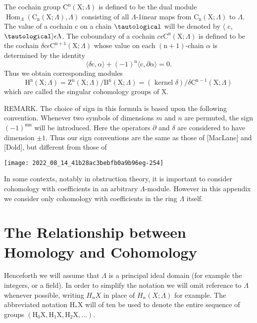 \documentclass[10pt]{article}
\begin{document}
The cochain group $\mathrm{C}^{\mathrm{n}}(\mathrm{X} ; \Lambda)$ is defined to be the dual module $\operatorname{Hom}_{\Lambda}\left(\mathrm{C}_{\mathrm{n}}(\mathrm{X} ; \Lambda), \Lambda\right)$ consisting of all $\Lambda$-1inear maps from $\mathrm{C}_{\mathrm{n}}(\mathrm{X} ; \Lambda)$ to $\Lambda$. The value of a cochain $\mathrm{c}$ on a chain $\tautological$ will be denoted by $\langle$ c, $\tautological\rangle \epsilon \Lambda$. The coboundary of a cochain $c \epsilon \mathrm{C}^{\mathrm{n}}(\mathrm{X} ; \Lambda)$ is defined to be the cochain $\delta \mathrm{c} \epsilon \mathrm{C}^{\mathrm{n}+1}(\mathrm{X} ; \Lambda)$ whose value on each $(\mathrm{n}+1)$-chain $\alpha$ is determined by the identity
$$
\langle\delta \mathrm{c}, \alpha\rangle+(-1)^{\mathrm{n}}\langle\mathrm{c}, \partial \alpha\rangle=0 .
$$
Thus we obtain corresponding modules
$$
\mathrm{H}^{\mathrm{n}}(\mathrm{X} ; \Lambda)=\mathrm{Z}^{\mathrm{n}}(\mathrm{X} ; \Lambda) / \mathrm{B}^{\mathrm{n}}(\mathrm{X} ; \Lambda)=(\text { kernel } \delta) / \delta \mathrm{C}^{\mathrm{n}-1}(\mathrm{X} ; \Lambda)
$$
which are called the singular cohomology groups of X.

REMARK. The choice of sign in this formula is based upon the following convention. Whenever two symbols of dimensions $m$ and $n$ are permuted, the sign $(-1)^{\mathrm{mn}}$ will be introduced. Here the operators $\partial$ and $\delta$ are considered to have dimension $\pm 1$. Thus our sign conventions are the same as those of [MacLane] and [Dold], but different from those of

\texttt{[image: 2022\_08\_14\_41b28ac3bebfb0a9b96eg-254]}

In some contexts, notably in obstruction theory, it is important to consider cohomology with coefficients in an arbitrary $\Lambda$-module. However in this appendix we consider only cohomology with coefficients in the ring $\Lambda$ itself.

\section{The Relationship between Homology and Cohomology}
Henceforth we will assume that $\Lambda$ is a principal ideal domain (for example the integers, or a field). In order to simplify the notation we will omit reference to $\Lambda$ whenever possible, writing $H_{n} X$ in place of $H_{n}(X ; \Lambda)$ for example. The abbreviated notation $\mathrm{H}_{*} \mathrm{X}$ will of ten be used to denote the entire sequence of groups $\left(\mathrm{H}_{0} \mathrm{X}, \mathrm{H}_{1} \mathrm{X}, \mathrm{H}_{2} \mathrm{X}, \ldots\right)$.
\end{document}
